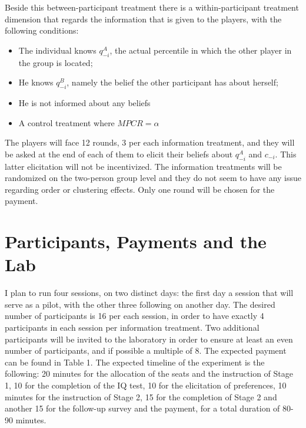\documentclass[11pt,twoside,a4paper,leqno]{article}
\begin{document}
Beside this between-participant treatment there is a within-participant treatment dimension that regards the information that is given to the players, with the following conditions:
\begin{itemize}
	\item The individual knows $q_{-i}^A$, the actual percentile in which the other player in the group is located;
	\item He knows $q_{-i}^B$, namely the belief the other participant has about herself;
	\item He is not informed about any beliefs
	\item A control treatment where $MPCR = \alpha$
\end{itemize}
The players will face 12 rounds, 3 per each information treatment, and they will be asked at the end of each of them to elicit their beliefs about $q_{-i}^A$ and $c_{-i}$. This latter elicitation will not be incentivized. The information treatments will be randomized on the two-person group level and they do not seem to have any issue regarding order or clustering effects. Only one round will be chosen for the payment.

\section*{Participants, Payments and the Lab}
I plan to run four sessions, on two distinct days: the first day a session that will serve as a pilot, with the other three following on another day. The desired number of participants is 16 per each session, in order to have exactly 4 participants in each session per information treatment. Two additional participants will be invited to the laboratory in order to ensure at least an even number of participants, and if possible a multiple of 8. The expected payment can be found in Table 1. The expected timeline of the experiment is the following: 20 minutes for the allocation of the seats and the instruction of Stage 1, 10 for the completion of the IQ test, 10 for the elicitation of preferences, 10 minutes for the instruction of Stage 2, 15 for the completion of Stage 2 and another 15 for the follow-up survey and the payment, for a total duration of 80-90 minutes.
\end{document}

